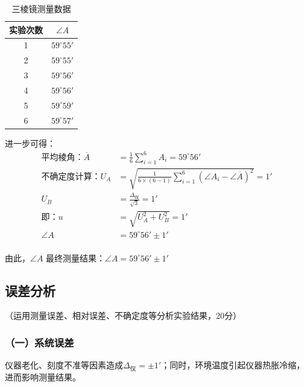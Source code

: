 \documentclass[10pt,a4paper]{ctexart}
\newcommand{\xiaosi}{\fontsize{12pt}{16pt}\selectfont}
\begin{document}
        \begin{table}[htbp]
            \centering
            \caption{三棱镜测量数据}
            \label{tab:bridge_custom}
            \begin{tabular}{cc}
                \toprule
                实验次数 & $\angle A$ \\
                \midrule
                1 & $59^\circ 55'$ \\
                2 & $59^\circ 55'$ \\
                3 & $59^\circ 56'$ \\
                4 & $59^\circ 56'$ \\
                5 & $59^\circ 59'$ \\
                6 & $59^\circ 57'$ \\
                \bottomrule
            \end{tabular}
        \end{table}

        进一步可得：
        \begin{align*}
        \text{平均棱角：}\overline{A} &= \frac{1}{6}\sum_{i=1}^{6}A_{i}=59^{\circ}56' \\
        \text{不确定度计算：}U_A &= \sqrt{\frac{1}{6\times(6 - 1)}\sum_{i=1}^{6}(\angle A_{i}-\angle \overline{A})^{2}} = 1'\\
        U_B &= \frac{\Delta_{\text{仪}}}{\sqrt{3}} = 1' \\
        \text{即：}u &= \sqrt{U_A^{2}+U_B^{2}} = 1' \\
        \angle A &= 59^{\circ}56'\pm1' \\
        \end{align*}

        由此，$ \angle A $ 最终测量结果：\(\angle A=59^{\circ}56'\pm1'\)

    \subsection{误差分析}
    \xiaosi （运用测量误差、相对误差、不确定度等分析实验结果，20分）
    
    \subsubsection*{（一）系统误差}
    
    仪器老化、刻度不准等因素造成\(\Delta_{\text{仪}}= \pm 1'\)；同时，环境温度引起仪器热胀冷缩，进而影响测量结果。
    
\end{document}
